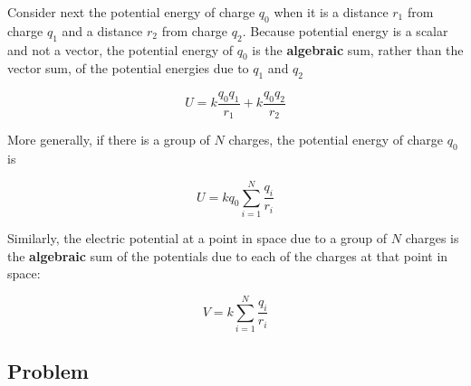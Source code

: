 \documentclass{article}
\begin{document}
Consider next the potential energy of charge $q_0$ when it is a distance $r_1$ from charge $q_1$ and a distance $r_2$ from charge $q_2$. Because potential energy is a scalar and not a vector, the potential energy of $q_0$ is the \textbf{algebraic} sum, rather than the vector sum, of the potential energies due to $q_1$ and $q_2$

\begin{equation}
U=k\frac{q_0q_1}{r_1}+k\frac{q_0q_2}{r_2}
\end{equation}

More generally, if there is a group of $N$ charges, the potential energy of charge $q_0$ is

\begin{equation}
U=k q_0 \sum_{i=1}^N {\frac{q_i}{r_i}}
\end{equation}

Similarly, the electric potential at a point in space due to a group of $N$ charges is the \textbf{algebraic} sum of the potentials due to each of the charges at that point in space:

\begin{equation}
V=k \sum_{i=1}^N {\frac{q_i}{r_i}}
\end{equation}

\newpage

\subsection{Problem}


\end{document}
